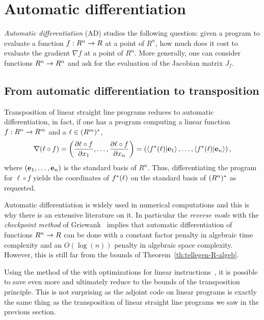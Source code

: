 \section{Automatic differentiation}
\label{sec:autom-diff}

\emph{Automatic differentiation}
(AD) studies the following
question: given a program to evaluate a function $f:R^n\rightarrow R$ at a
point of $R^n$, how much does it cost to evaluate the gradient $\nabla
f$ at a point of $R^n$. More generally, one can consider functions
$R^n\rightarrow R^n$ and ask for the evaluation of the Jacobian matrix $J_f$.

\subsection{From automatic differentiation to transposition}
\label{sec:from-autom-diff}
Transposition of linear straight line programs reduces to automatic
differentiation, in fact, if one has a program computing a linear
function $f:R^n\rightarrow R^m$ and a $\ell\in(R^m)^\ast$,
\begin{equation}
  \label{eq:261}
  \nabla (\ell\circ f) =
  \left(\frac{\partial \ell\circ f}{\partial x_1},\ldots,\frac{\partial \ell\circ f}{\partial x_n}\right) =
  \left(\left\langle f^\ast(\ell) \middle| \mathbf{e}_1 \right\rangle,\ldots,\left\langle f^\ast(\ell) \middle| \mathbf{e}_n \right\rangle\right)
  \text{,}
\end{equation}
where $(\mathbf{e}_1,\ldots,\mathbf{e}_n)$ is the standard basis of
$R^n$. Thus, differentiating the program for $\ell\circ f$ yields the
coordinates of $f^\ast(\ell)$ on the standard basis of
$(R^n)^\ast$ as requested.

Automatic differentiation is widely used in numerical computations and
this is why there is an extensive literature on it. In particular the
\emph{reverse
  mode} with the
\emph{checkpoint
  method} of Griewank~\cite{griewank92} implies that automatic
differentiation of functions $R^n\rightarrow R$ can be done with a constant
factor penalty in algebraic time complexity and an $O(\log(n))$
penalty in algebraic space complexity. However, this is still far from
the bounds of Theorem~\ref{th:tellegen-R-algeb}.

Using the method of the
 with optimizations for linear
instructions~\cite{gilbert+levey+masse91}, it is possible to save even
more and ultimately reduce to the bounds of the transposition
principle. This is not surprising as the adjoint code on linear
programs is exactly the same thing as the transposition of linear
straight line programs we saw in the previous section.

